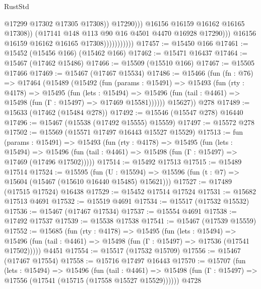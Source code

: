 \begin{lexlean}{RustStd}
\begin{coremodule}
                                            @17299
                                            @17302
                                            @17305
                                            @17308))
                                        @17290)))
                                  @16156
                                  @16159
                                  @16162
                                  @16165
                                  @17308))
                              (@17141 @148 @113 @90 @16 @4501 @4470 @16928 @17290)))
                          @16156
                          @16159
                          @16162
                          @16165
                          @17308)))))))))))
@17457 := @15450 @166
@17461 := @15452 (@15456 @166) (@15462 @166)
@17462 := @15471 @16437
@17464 := @15467 (@17462 @15486)
@17466 := @15509 (@15510 @166)
@17467 := @15505 @17466
@17469 := @15467 (@17467 @15534)
@17486 := @15466
    (fun (fn : @76) =>
    @17464
      (@15489
        (@15492
          (fun (params : @15491) =>
          @15493
            (fun (rty : @4178) =>
            @15495
              (fun (lets : @15494) =>
              @15496 (fun (tail : @4461) => @15498 (fun (Γ : @15497) => @17469 @15581))))))
        @15627))
    @278
@17489 := @15633 (@17462 (@15484 @278))
@17492 := @15546 (@15547 @278) @16440
@17496 := @15467 (@15538 (@17492 @15555) @15559)
@17497 := @15572 @278
@17502 := @15569 (@15571 @17497 @16443 @15527 @15529)
@17513 := fun (params : @15491) =>
  @15493
    (fun (rty : @4178) =>
    @15495
      (fun (lets : @15494) =>
      @15496 (fun (tail : @4461) => @15498 (fun (Γ : @15497) => @17469 (@17496 @17502)))))
@17514 := @15492 @17513
@17515 := @15489 @17514
@17524 := @15595
    (fun (U : @15594) => @15596 (fun (t : @7) => @15604 (@15467 (@15610 @16440 @15485) @15621)))
@17527 := @17489 (@17515 @17524) @16438
@17529 := @15452 @17514 @17524
@17531 := @15682 @17513 @4691
@17532 := @15519 @4691
@17534 := @15517 (@17532 @15532)
@17536 := @15467 (@17467 @17534)
@17537 := @15554 @4691
@17538 := @17492 @17537
@17539 := @15538 @17538
@17541 := @15467 (@17539 @15559)
@17552 := @15685
    (fun (rty : @4178) =>
    @15495
      (fun (lets : @15494) =>
      @15496 (fun (tail : @4461) => @15498 (fun (Γ : @15497) => @17536 (@17541 @17502)))))
    @4451
@17554 := @15517 (@17532 @15709)
@17556 := @15467 (@17467 @17554)
@17558 := @15716 @17497 @16443
@17570 := @15707
    (fun (lets : @15494) =>
    @15496
      (fun (tail : @4461) =>
      @15498 (fun (Γ : @15497) => @17556 (@17541 (@15715 (@17558 @15527 @15529))))))
    @4728

\end{coremodule}
\end{lexlean}
